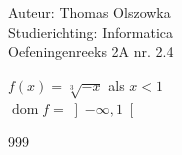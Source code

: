 \documentclass[a4paper]{article}
\begin{document}
\noindent \large Auteur: Thomas Olszowka \\
\noindent \large Studierichting: Informatica\\
\noindent \large Oefeningenreeks 2A nr. 2.4\\

\medskip

\normalsize

$f(x) = \sqrt[3]{-x}$ als $x < 1$ \\

$\operatorname{dom}f = \left]-\infty, 1\right[$ \\

\begin{thebibliography}{999}
\end{thebibliography}
\end{document}
